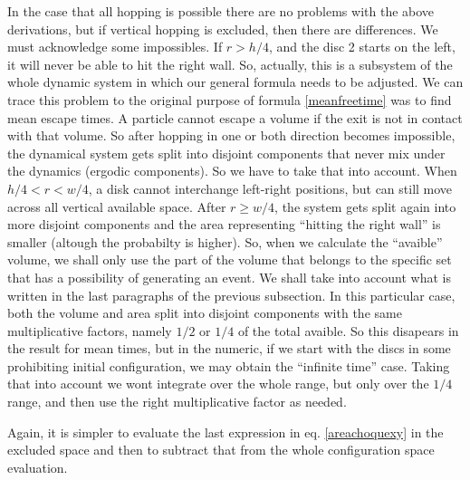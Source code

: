 \documentclass[superscriptaddress,pre,reprint,showpacs,onecolumn]{revtex4-1}
\begin{document}
    
    In the case that all hopping is possible there are no problems with the above derivations,
    but if vertical hopping is excluded, then there are differences.
    We must acknowledge some impossibles. If $r>h/4$, and the disc 2 starts
    on the left, it will never be able to hit the right wall. So, actually, this
    is a subsystem of the whole dynamic system in which our general formula needs
    to be adjusted. We can trace this problem to the original purpose of
    formula \ref{meanfreetime}
    was to find mean escape times. A particle cannot escape a volume if the exit is
    not in contact with that volume. So after hopping in one or both direction
    becomes impossible, the dynamical system gets split into disjoint components
    that never mix under the dynamics (ergodic components). So we have to take that
    into account. When $h/4<r<w/4$, a disk cannot interchange left-right positions,
    but can still move across all vertical available space.  After $r\geq w/4$,
    the system gets split again into more disjoint components and the
    area representing ``hitting the right wall'' is smaller (altough the probabilty is
    higher). So, when we calculate the ``avaible'' volume, we shall only use the
    part of the volume that belongs to the specific set that has a possibility of
    generating an event. We shall take into account what is written in the last
    paragraphs of the previous subsection. In this particular case, both the
    volume and area split into disjoint components with the same multiplicative
    factors, namely $1/2$ or $1/4$ of the total avaible. So this disapears in the
    result for mean times, but in the numeric, if we start with the discs in some
    prohibiting initial configuration, we may obtain the ``infinite time'' case.
    Taking that into account we wont integrate over the whole range, but only over
    the $1/4$ range, and then use the right multiplicative factor as needed.

    Again, it is simpler to evaluate the last expression in eq. \ref{areachoquexy}
    in the excluded space and then to subtract that from the whole configuration
    space evaluation.
\end{document}
